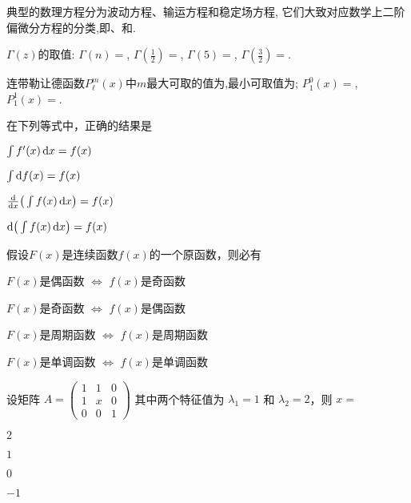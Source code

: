 \documentclass{njustexam}
\begin{document}
\begin{problem}
典型的数理方程分为波动方程、输运方程和稳定场方程,
它们大致对应数学上二阶偏微分方程的分类,即、和.
\end{problem}

\begin{problem}
$\Gamma(z)$的取值: $\Gamma(n)=$, 
$\Gamma(\frac{1}{2})=$\fillout{$\sqrt{\pi}$}, $\Gamma(5)=$,
 $\Gamma(\frac{3}{2})=$.
\end{problem}

\begin{problem}
连带勒让德函数$P_\ell^m(x)$中$m$最大可取的值为\fillout{$\ell$},最小可取值为\fillout{$-\ell$};
$P_1^0(x) = $, $P_1^1(x) = $.
\end{problem}


\begin{problem}
在下列等式中，正确的结果是
\begin{abcd}
\item $\int f'(x)\mathop{}\!\mathrm{d} x=f(x)$
\item $\int \d f(x)=f(x)$
\item $\frac{\d}{\dx}\big(\int f(x)\dx\big)=f(x)$
\item $\d\big(\int f(x)\dx\big)=f(x)$
\end{abcd}
\end{problem}

\bigskip

\begin{problem}
假设$F(x)$是连续函数$f(x)$的一个原函数，则必有
\begin{abcd}
\item $F(x)$是偶函数 $\Leftrightarrow$ $f(x)$是奇函数
\item $F(x)$是奇函数 $\Leftrightarrow$ $f(x)$是偶函数
\item $F(x)$是周期函数 $\Leftrightarrow$ $f(x)$是周期函数
\item $F(x)$是单调函数 $\Leftrightarrow$ $f(x)$是单调函数
\end{abcd}
\end{problem}

\bigskip

\begin{problem}
设矩阵 $A = \left(\begin{array}{ccc}
  1 & 1 & 0\\
  1 & x & 0\\
  0 & 0 & 1
\end{array}\right)$ 其中两个特征值为 $\lambda_1 = 1$ 和 $\lambda_2
= 2$，则 $x=$ 
\begin{abcd}
\item $2$
\item $1$
\item $0$
\item $-1$
\end{abcd}
\end{problem}
\end{document}
